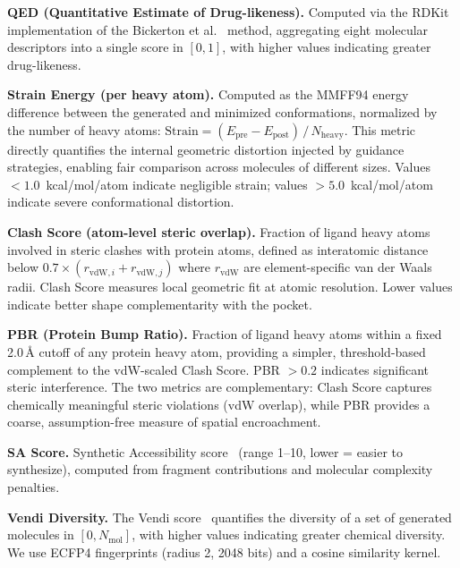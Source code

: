 \documentclass{article}
\begin{document}
\vspace{4pt}
\noindent\textbf{QED (Quantitative Estimate of Drug-likeness).}
Computed via the RDKit implementation of the Bickerton et
al.~\cite{bickerton2012qed} method, aggregating eight molecular descriptors
into a single score in $[0, 1]$, with higher values indicating greater
drug-likeness.

\vspace{4pt}
\noindent\textbf{Strain Energy (per heavy atom).}
Computed as the MMFF94 energy difference between the generated and
minimized conformations, normalized by the number of heavy atoms:
$\mathrm{Strain} = (E_{\text{pre}} - E_{\text{post}})\,/\,N_{\text{heavy}}$.
This metric directly quantifies the internal geometric distortion injected
by guidance strategies, enabling fair comparison across molecules of
different sizes.  Values $<1.0$~kcal/mol/atom indicate negligible strain;
values $>5.0$~kcal/mol/atom indicate severe conformational distortion.

\vspace{4pt}
\noindent\textbf{Clash Score (atom-level steric overlap).}
Fraction of ligand heavy atoms involved in steric clashes with protein
atoms, defined as interatomic distance below $0.7 \times (r_{\text{vdW},i}
+ r_{\text{vdW},j})$ where $r_{\text{vdW}}$ are element-specific van der
Waals radii.  Clash Score measures local geometric fit at atomic resolution.
Lower values indicate better shape complementarity with the pocket.

\vspace{4pt}
\noindent\textbf{PBR (Protein Bump Ratio).}
Fraction of ligand heavy atoms within a fixed 2.0\,\AA{} cutoff of any
protein heavy atom, providing a simpler, threshold-based complement to
the vdW-scaled Clash Score.  PBR $>0.2$ indicates significant steric
interference.  The two metrics are complementary: Clash Score captures
chemically meaningful steric violations (vdW overlap), while PBR provides
a coarse, assumption-free measure of spatial encroachment.

\vspace{4pt}
\noindent\textbf{SA Score.}
Synthetic Accessibility score~\cite{ertl2009} (range 1--10, lower =
easier to synthesize), computed from fragment contributions and
molecular complexity penalties.

\vspace{4pt}
\noindent\textbf{Vendi Diversity.}
The Vendi score~\cite{friedman2023vendi} quantifies the diversity of a
set of generated molecules in $[0, N_{\text{mol}}]$, with higher values
indicating greater chemical diversity.  We use ECFP4 fingerprints
(radius 2, 2048 bits) and a cosine similarity kernel.
\end{document}
